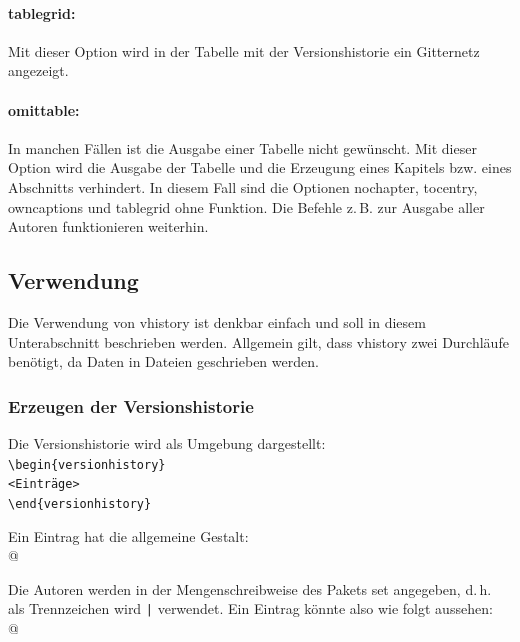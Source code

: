 \paragraph{tablegrid:} Mit dieser Option wird in der Tabelle mit der Versionshistorie ein Gitternetz angezeigt.

\paragraph{omittable:} In manchen Fällen ist die Ausgabe einer Tabelle nicht gewünscht. Mit dieser Option wird die Ausgabe der Tabelle und die Erzeugung eines Kapitels bzw. eines Abschnitts verhindert. In diesem Fall sind die Optionen nochapter, tocentry, owncaptions und tablegrid ohne Funktion. Die Befehle z.\,B. zur Ausgabe aller Autoren funktionieren weiterhin.

\subsection{Verwendung}\label{verwendung}
Die Verwendung von vhistory ist denkbar einfach und soll in diesem Unterabschnitt beschrieben werden. Allgemein gilt, dass vhistory zwei Durchläufe benötigt, da Daten in Dateien geschrieben werden.

\subsubsection{Erzeugen der Versionshistorie}\label{begin}
Die Versionshistorie wird als Umgebung dargestellt:\\
\mbox{}\hspace{2em}\verb|\begin{versionhistory}|\\
\mbox{}\hspace{2em}\verb|<Einträge>|\\
\mbox{}\hspace{2em}\verb|\end{versionhistory}|

Ein Eintrag hat die allgemeine Gestalt:\\
\mbox{}\hspace{2em}\verb@{}@

Die Autoren werden in der Mengenschreibweise des Pakets set angegeben, d.\,h. als Trennzeichen wird \texttt{|} verwendet. Ein Eintrag könnte also wie folgt aussehen:\\
\mbox{}\hspace{2em}\verb@{}@

